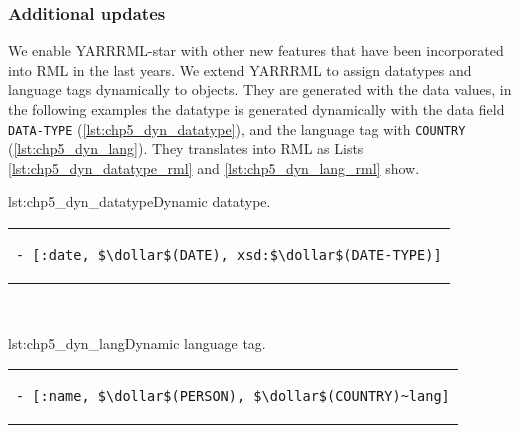 \subsubsection{Additional updates} %
We enable YARRRML-star with other new features that have been incorporated into RML in the last years. 
We extend YARRRML to assign datatypes and language tags dynamically to objects. 
They are generated with the data values, in the following examples the datatype is generated dynamically with the data field \texttt{DATA-TYPE} (\cref{lst:chp5_dyn_datatype}), and the language tag with \texttt{COUNTRY} (\cref{lst:chp5_dyn_lang}). They translates into RML as Lists \ref{lst:chp5_dyn_datatype_rml} and \ref{lst:chp5_dyn_lang_rml} show.




\begin{minipage}{0.45\linewidth}
\begin{captionedlisting}{lst:chp5_dyn_datatype}{Dynamic datatype.}
\centering
\begin{tabular}{c}
\hspace{-3em}
{
\begin{lstlisting}[basicstyle=\ttfamily\small,columns=flexible]
  - [:date, $\dollar$(DATE), xsd:$\dollar$(DATE-TYPE)]
\end{lstlisting}
}
\end{tabular}
\end{captionedlisting}
\end{minipage}
\,\,\,\,\hfill
\begin{minipage}{0.45\linewidth}
\begin{captionedlisting}{lst:chp5_dyn_lang}{Dynamic language tag.}
\centering
\begin{tabular}{c}
\hspace{-2.5em}
{
\begin{lstlisting}[basicstyle=\ttfamily\small,columns=flexible]
 - [:name, $\dollar$(PERSON), $\dollar$(COUNTRY)~lang]
\end{lstlisting}
}
\end{tabular}
\end{captionedlisting}
\end{minipage}








